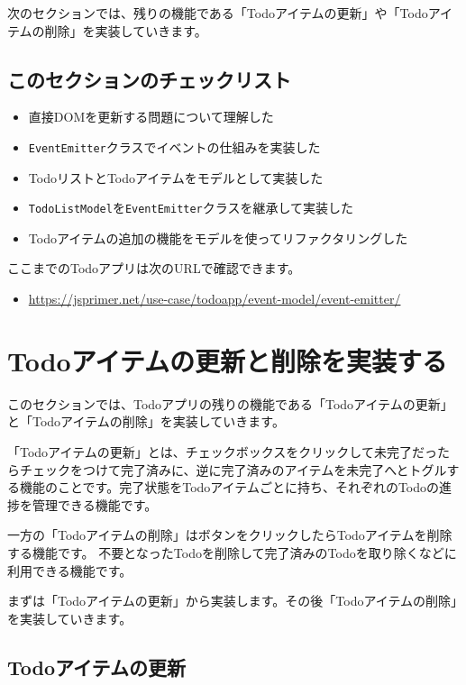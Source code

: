 次のセクションでは、残りの機能である「Todoアイテムの更新」や「Todoアイテムの削除」を実装していきます。

\hypertarget{section-checklist}{%
\subsection{このセクションのチェックリスト}\label{section-checklist}}

\begin{itemize}
\item
  直接DOMを更新する問題について理解した
\item
  \texttt{EventEmitter}クラスでイベントの仕組みを実装した
\item
  TodoリストとTodoアイテムをモデルとして実装した
\item
  \texttt{TodoListModel}を\texttt{EventEmitter}クラスを継承して実装した
\item
  Todoアイテムの追加の機能をモデルを使ってリファクタリングした
\end{itemize}

ここまでのTodoアプリは次のURLで確認できます。

\begin{itemize}
\item
  \url{https://jsprimer.net/use-case/todoapp/event-model/event-emitter/}
\end{itemize}

\hypertarget{todo-item-update-and-delete}{%
\section{Todoアイテムの更新と削除を実装する}\label{todo-item-update-and-delete}}

このセクションでは、Todoアプリの残りの機能である「Todoアイテムの更新」と「Todoアイテムの削除」を実装していきます。

「Todoアイテムの更新」とは、チェックボックスをクリックして未完了だったらチェックをつけて完了済みに、逆に完了済みのアイテムを未完了へとトグルする機能のことです。完了状態をTodoアイテムごとに持ち、それぞれのTodoの進捗を管理できる機能です。

一方の「Todoアイテムの削除」はボタンをクリックしたらTodoアイテムを削除する機能です。
不要となったTodoを削除して完了済みのTodoを取り除くなどに利用できる機能です。

まずは「Todoアイテムの更新」から実装します。その後「Todoアイテムの削除」を実装していきます。

\hypertarget{todo-item-update}{%
\subsection{Todoアイテムの更新}\label{todo-item-update}}

